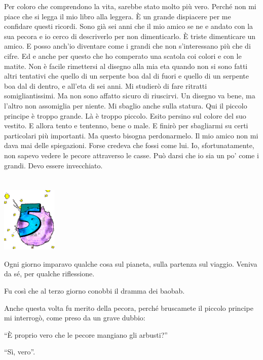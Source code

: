 \documentclass[11pt]{scrbook}
\begin{document}
Per coloro che comprendono la vita, sarebbe stato molto più vero. Perché non mi piace che si legga il mio libro alla leggera. È un grande dispiacere per me confidare questi ricordi. Sono già sei anni che il mio amico se ne e andato con la sua pecora e io cerco di descriverlo per non dimenticarlo. È triste dimenticare un amico. E posso anch'io diventare come i grandi che non s'interessano più che di cifre. Ed e anche per questo che ho comperato una scatola coi colori e con le matite. Non è facile rimettersi al disegno alla mia eta quando non si sono fatti altri tentativi che quello di un serpente boa dal di fuori e quello di un serpente boa dal di dentro, e all'eta di sei anni. Mi studierò di fare ritratti somigliantissimi. Ma non sono affatto sicuro di riuscirvi. Un disegno va bene, ma l'altro non assomiglia per niente. Mi sbaglio anche sulla statura. Qui il piccolo principe è troppo grande. Là è troppo piccolo. Esito persino sul colore del suo vestito. E allora tento e tentenno, bene o male. E finirò per sbagliarmi su certi particolari più importanti. Ma questo bisogna perdonarmelo. Il mio amico non mi dava mai delle spiegazioni. Forse credeva che fossi come lui. Io, sfortunatamente, non sapevo vedere le pecore attraverso le casse. Può darsi che io sia un po' come i grandi. Devo essere invecchiato.

\chapter{}
\begin{center}
\includegraphics{img/chapter5}
\end{center}

Ogni giorno imparavo qualche cosa sul pianeta, sulla partenza sul viaggio. Veniva da sé, per qualche riflessione.

Fu così che al terzo giorno conobbi il dramma dei baobab.

Anche questa volta fu merito della pecora, perché bruscamete il piccolo principe mi interrogò, come preso da un grave dubbio:

``È proprio vero che le pecore mangiano gli arbusti?''

``Sì, vero''.
\end{document}

